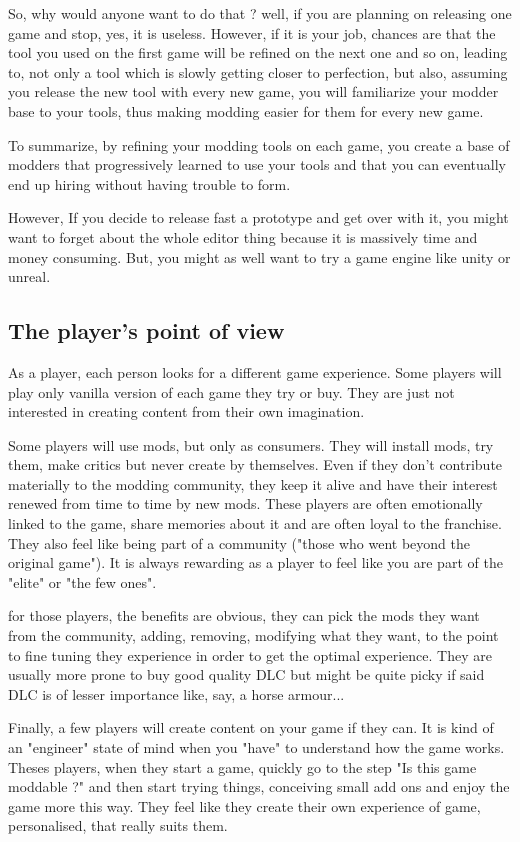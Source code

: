 \documentclass[a4paper,12pt]{article}
\begin{document}
So, why would anyone want to do that ? well, if you are planning on releasing one game and stop, yes, it is useless. However, if it is your job, chances are that the tool you used on the first game will be refined on the next one and so on, leading to, not only a tool which is slowly getting closer to perfection, but also, assuming you release the new tool with every new game, you will familiarize your modder base to your tools, thus making modding easier for them for every new game.

To summarize, by refining your modding tools on each game, you create a base of modders that progressively learned to use your tools and that you can eventually end up hiring without having trouble to form.

However, If you decide to release fast a prototype and get over with it, you might want to forget about the whole editor thing because it is massively time and money consuming. But, you might as well want to try a game engine like unity or unreal.

\subsection{The player's point of view}

As a player, each person looks for a different game experience. Some players will play only vanilla version of each game they try or buy. They are just not interested in creating content from their own imagination.

Some players will use mods, but only as consumers. They will install mods, try them, make critics but never create by themselves. Even if they don't contribute materially to the modding community, they keep it alive and have their interest renewed from time to time by new mods. These players are often emotionally linked to the game, share memories about it and are often loyal to the franchise. They also feel like being part of a community ("those who went beyond the original game"). It is always rewarding as a player to feel like you are part of the "elite" or "the few ones".

for those players, the benefits are obvious, they can pick the mods they want from the community, adding, removing, modifying what they want, to the point to fine tuning they experience in order to get the optimal experience. They are usually more prone to buy good quality DLC but might be quite picky if said DLC is of lesser importance like, say, a horse armour...

Finally, a few players will create content on your game if they can. It is kind of an "engineer" state of mind when you "have" to understand how the game works. Theses players, when they start a game, quickly go to the step "Is this game moddable ?" and then start trying things, conceiving small add ons and enjoy the game more this way. They feel like they create their own experience of game, personalised, that really suits them.
\end{document}
